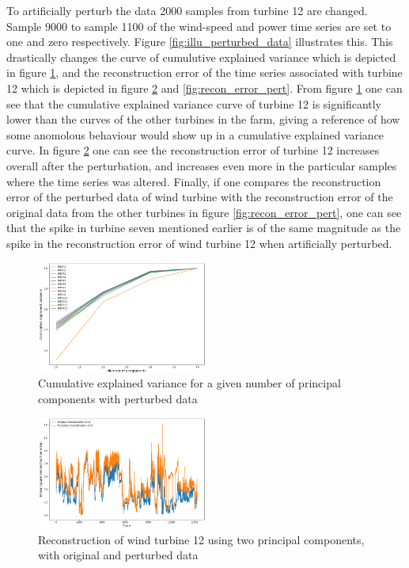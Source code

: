 To artificially perturb the data 2000 samples from turbine 12 are changed. 
Sample 9000 to sample 1100 of the wind-speed and power time series are set to one and zero respectively.
Figure \ref{fig:illu_perturbed_data} illustrates this. 
This drastically changes the curve of cumulutive explained variance which is depicted in figure \ref{fig:cum_exp_var_pert}, and the reconstruction error of the time series associated with turbine 12 which is depicted in figure \ref{fig:recon_error_pert_vs_unpert} and \ref{fig:recon_error_pert}.
From figure \ref{fig:cum_exp_var_pert} one can see that the cumulative explained variance curve of turbine 12 is significantly lower than the curves of the other turbines in the farm, giving a reference of how some anomolous behaviour would show up in a cumulative explained variance curve. 
In figure \ref{fig:recon_error_pert_vs_unpert} one can see the reconstruction error of turbine 12 increases overall after the perturbation, and increases even more in the particular samples where the time series was altered. 
Finally, if one compares the reconstruction error of the perturbed data of wind turbine with the reconstruction error of the original data from the other turbines in figure \ref{fig:recon_error_pert}, one can see that the spike in turbine seven mentioned earlier is of the same magnitude as the spike in the reconstruction error of wind turbine 12 when artificially perturbed. 

\begin{figure}
    \begin{center}
    \includegraphics[width=0.5\textwidth]{data_exp/explained_variance_perturbed}
    \end{center}
    \caption{Cumulative explained variance for a given number of principal components with perturbed data} 
    \label{fig:cum_exp_var_pert}
\end{figure}

\begin{figure}
    \begin{center}
    \includegraphics[width=0.5\textwidth]{data_exp/pert_vs_unpert_reconstruction_error}
    \end{center}
    \caption{Reconstruction of wind turbine 12 using two principal components, with original and perturbed data} 
    \label{fig:recon_error_pert_vs_unpert}
\end{figure}

